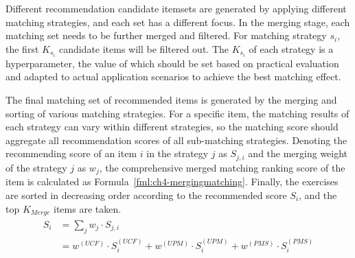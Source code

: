 
Different recommendation candidate itemsets are generated by applying different matching strategies, and each set has a different focus. In the merging stage, each matching set needs to be further merged and filtered. For matching strategy \(s_i\), the first \(K_{s_i}\) candidate items will be filtered out. The \(K_{s_i}\) of each strategy is a hyperparameter, the value of which should be set based on practical evaluation and adapted to actual application scenarios to achieve the best matching effect.

The final matching set of recommended items is generated by the merging and sorting of various matching strategies. For a specific item, the matching results of each strategy can vary within different strategies, so the matching score should aggregate all recommendation scores of all sub-matching strategies.  Denoting the recommending score of an item \(i\) in the strategy \(j\) as \(S_{j, i}\) and the merging weight of the strategy \(j\) as \(w_j\), the comprehensive merged matching ranking score of the item is calculated as Formula~\ref{fml:ch4-mergingmatching}. Finally, the exercises are sorted in decreasing order according to the recommended score \(S_i\), and the top \(K_{Merge}\) items are taken.
\begin{align}\label{fml:ch4-mergingmatching}
  \begin{split}
    S_i & = \sum_{j}{w_j\cdot S_{j,i}}                                                       \\
    & = w^{(UCF)}\cdot S^{(UCF)}_i+w^{(UPM)}\cdot S^{(UPM)}_i+w^{(PMS)}\cdot S^{(PMS)}_i
  \end{split}
\end{align}


